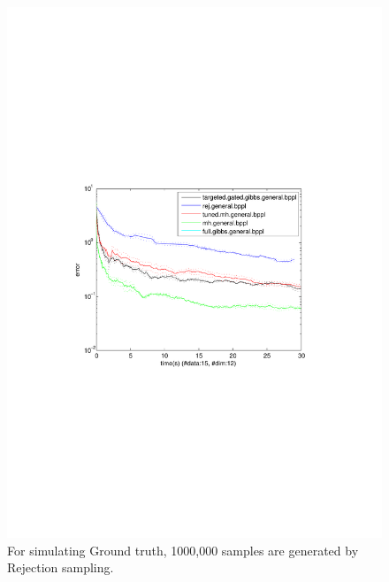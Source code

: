 \begin{figure}%
\centering
\includegraphics[width=1.2\textwidth]{pic1/errVtimeData15Dim12.pdf}
\caption{\footnotesize For simulating Ground truth, 1000,000 samples are generated by Rejection sampling. }
\label{fig:pref}
\end{figure}

